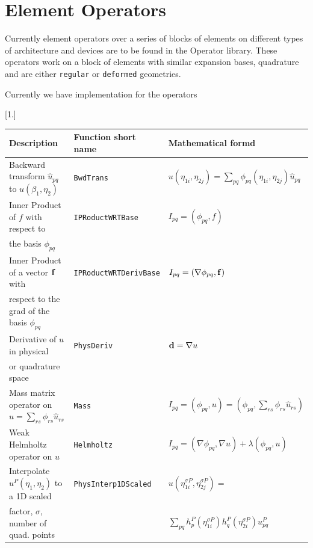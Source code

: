 \chapter{Element Operators}

Currently element operators over a series of blocks of elements on
different types of architecture and devices are to be found in the
Operator library. These operators work on a block of elements with
similar expansion bases, quadrature and are either \texttt{regular} or
\texttt{deformed} geometries.

Currently we have implementation for the operators

    \begin {table}[htbp!]
    \begin{center}
    \scalebox{0.9}[1.]{
    \begin{tabular}{ |l | l| l|}
      \hline      
      \textbf{Description} & \textbf{Function short name} & \textbf{ Mathematical formd} \\  
      \hline
Backward transform $\hat{u}_{pq}$ to $u(\beta_1, \eta_2)$ &  \texttt{BwdTrans}  &  $u(\eta_{1i}, \eta_{2j}) = \sum_{pq} \phi_{pq}(\eta_{1i}, \eta_{2j}) \hat{u}_{pq}$\\
      \hline
Inner Product of $f$ with respect to  &  \texttt{IPRoductWRTBase}  &  $I_{pq} = (\phi_{pq}, f)$\\
the basis $\phi_{pq}$ &   & \\
      \hline
Inner Product of a vector  ${\bf f}$ with &  \texttt{IPRoductWRTDerivBase}  &  $I_{pq} = (\nabla \phi_{pq}, {\bf f})$\\
respect to the grad of the basis $\phi_{pq}$ & & \\
      \hline
Derivative of $u$ in physical & \texttt{PhysDeriv} & ${\bf d} = \nabla u$  \\
or quadrature space & & \\
      \hline
Mass matrix operator on $u = \sum_{rs} \phi_{rs} \hat{u}_{rs}$ & \texttt{Mass} & $ I_{pq}  = (\phi_{pq}, u) = (\phi_{pq}, \sum_{rs} \phi_{rs} \hat{u}_{rs})$  \\
      \hline
Weak Helmholtz operator on $u$& \texttt{Helmholtz} & $ I_{pq}  = (\nabla \phi_{pq}, \nabla u) + \lambda (\phi_{pq}, u)$  \\
      \hline
      Interpolate $u^P(\eta_1,\eta_2)$  to a 1D scaled  & \texttt{PhysInterp1DScaled} & 
    $u(\eta^{\sigma P}_{1i}, \eta^{\sigma P}_{2j}) = $\\
factor, $\sigma$, number of quad. points && \hspace{12pt} $\sum_{pq} h^P_{p}(\eta^{\sigma P}_{1i}) h^P_{q}(\eta^{\sigma P}_{2i}) u^P_{pq}$  \\

\end{tabular}}
\end{center}
\end{table}

